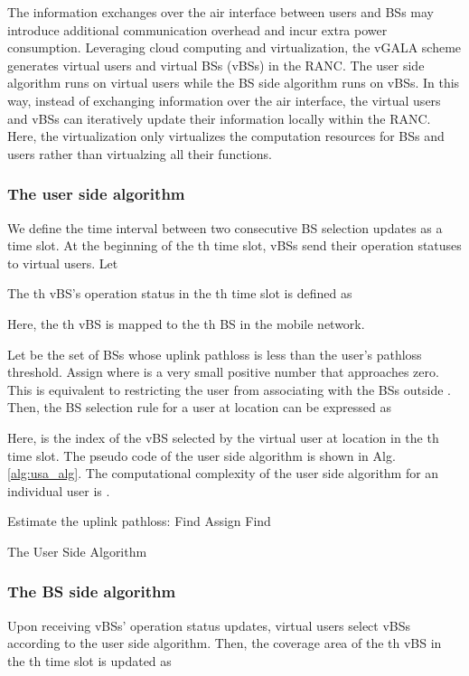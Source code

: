 \documentclass[journal]{IEEEtran}
\theoremstyle{definition}
\begin{document}
The information exchanges over the air interface between users and BSs may introduce additional communication overhead and incur extra power consumption. Leveraging cloud computing and virtualization, the vGALA scheme generates virtual users and virtual BSs (vBSs) in the RANC. The user side algorithm runs on virtual users while the BS side algorithm runs on vBSs. In this way, instead of exchanging information over the air interface, the virtual users and vBSs can iteratively update their information locally within the RANC. Here, the virtualization only virtualizes the computation resources for BSs and users rather than virtualzing all their functions.

\subsubsection{The user side algorithm}
We define the time interval between two consecutive BS selection updates as a time slot. At the beginning of the th time slot, vBSs send their operation statuses to virtual users. Let

The th vBS's operation status in the th time slot is defined as

Here, the th vBS is mapped to the th BS in the mobile network.

Let  be the set of BSs whose uplink pathloss is less than the user's pathloss threshold. Assign  where  is a very small positive number that approaches zero. This is equivalent to restricting the user from associating with the BSs outside .
Then, the BS selection rule for a user at location  can be expressed as

Here,  is the index of the vBS selected by the virtual user at location  in the th time slot.
The pseudo code of the user side algorithm is shown in Alg. \ref{alg:usa_alg}. The computational complexity of the user side algorithm for an individual user is .

\begin{algorithm}
\nl Estimate the uplink pathloss: \;
\nl Find \;
\nl Assign \;
\nl Find \;
\caption{The User Side Algorithm\label{alg:usa_alg}}
\end{algorithm}


\subsubsection{The BS side algorithm}
Upon receiving vBSs' operation status updates, virtual users select vBSs according to the user side algorithm. Then, the coverage area of the th vBS in the th time slot is updated as
\end{document}

